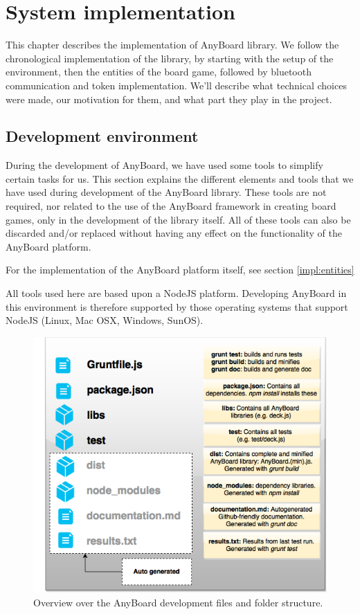 \chapter{System implementation} \label{ch:implementation}

This chapter describes the implementation of AnyBoard library. We follow the chronological implementation of the library, by starting with the setup of the environment, then the entities of the board game, followed by bluetooth communication and token implementation. We'll describe what technical choices were made, our motivation for them, and what part they play in the project. 

\section{Development environment}
During the development of AnyBoard, we have used some tools to simplify certain tasks for us. This section explains the different elements and tools that we have used during development of the AnyBoard library. These tools are not required, nor related to the use of the AnyBoard framework in creating board games, only in the development of the library itself. All of these tools can also be discarded and/or replaced without having any effect on the functionality of the AnyBoard platform.

For the implementation of the AnyBoard platform itself, see section \ref{impl:entities}

All tools used here are based upon a NodeJS platform. Developing AnyBoard in this environment is therefore supported by those operating systems that support NodeJS (Linux, Mac OSX, Windows, SunOS). 

\begin{figure}[ht]
\includegraphics[width=12cm]{img/anyboard-development-overview}
\centering
\caption{Overview over the AnyBoard development files and folder structure.}
\label{fig:anyboard_development_overview}
\end{figure}

